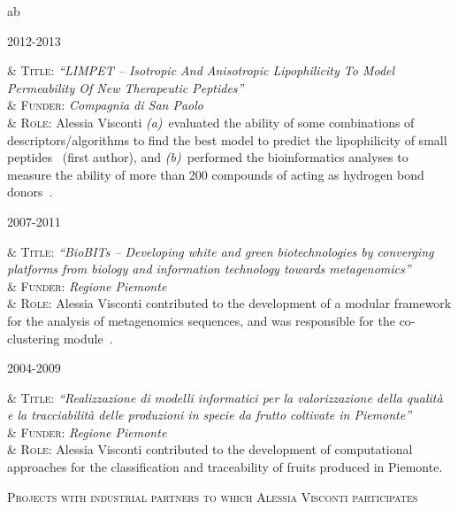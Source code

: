 \documentclass[a4paper,10pt]{article}
\newcommand{\smalltitle}[1]{
	\vspace{0.1cm}
	{\noindent 
	\large \textsc{#1}}
	\vspace{0.1cm}
}
\newcommand{\dtlist}[2]{
\hspace{-3cm}
\noindent
	\begin{minipage}{0.22\textwidth}
	\begin{flushright}
	\textsc{#1}
	\end{flushright}
	\end{minipage}
	& #2\\[0.2cm]
}
\newenvironment{singletablelist}
{	\vspace{-0.2cm}
	\begin{longtable}[!h]{ab}}{\end{longtable}
}
\newcommand{\stlist}[2]{
	\hspace{-3cm}
	\noindent
	\begin{minipage}{0.24\textwidth}
	\begin{flushright}
	\textsc{#1}
	\end{flushright}
	\end{minipage}
	& #2\\[0.2cm]
}
\begin{document}
\begin{singletablelist}
	\stlist{2012-2013}{
		\textsc{Title:} \emph{``LIMPET -- Isotropic And Anisotropic Lipophilicity To Model Permeability Of New Therapeutic Peptides''}\\
		& \textsc{Funder:} \emph{Compagnia di San Paolo}\\
		& \textsc{Role:} Alessia Visconti \emph{(a)}~evaluated the ability of some combinations of descriptors/algorithms to find the best model to predict the lipophilicity of small peptides~\cite{Vis15a} (first author), and \emph{(b)}~performed the bioinformatics analyses to measure the ability of more than 200 compounds of acting as hydrogen bond donors~\cite{Erm14}.}	

	\stlist{2007-2011}{
		\textsc{Title:} \emph{``BioBITs -- Developing white and green biotechnologies by converging platforms from biology and information technology towards metagenomics''}\\
		& \textsc{Funder:} \emph{Regione Piemonte}\\
		& \textsc{Role:} Alessia Visconti contributed to the development of a modular framework for the analysis of metagenomics sequences, and was responsible for the co-clustering module~\cite{Bon11}.}
	
	\dtlist{2004-2009}{
		\textsc{Title:} \emph{``Realizzazione di modelli informatici per la valorizzazione della qualit\`a e la tracciabilit\`a delle produzioni in specie da frutto coltivate in Piemonte''}\\
		& \textsc{Funder:} \emph{Regione Piemonte}\\
		& \textsc{Role:} Alessia Visconti contributed to the development of computational approaches for the classification and traceability of fruits produced in Piemonte.}
			
\end{singletablelist}


\smalltitle{Projects with industrial partners to which Alessia Visconti participates}
\end{document}
